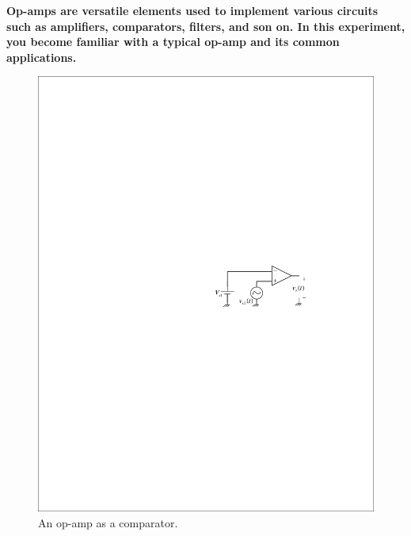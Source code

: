\documentclass[11pt]{article}
\begin{document}
\textbf{Op-amps are versatile elements used to implement various circuits such as amplifiers, comparators, filters, and son on. In this experiment, you become familiar with a typical op-amp and its common applications.
}



\begin{question}


    \begin{figure}[H]
        \centering
        \includegraphics[scale=1.2,angle=0]{Fig/cir1.pdf}
        \caption{An op-amp as a comparator.} \label{fig:cir1}
    \end{figure}


\end{question}
\end{document}
